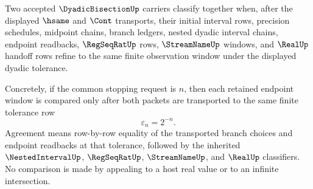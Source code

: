 \begin{definition}
\label{def:dyadic-bisection-classifier}
Two accepted $\DyadicBisectionUp$ carriers classify together when, after the displayed $\hsame$ and $\Cont$ transports, their initial interval rows, precision schedules, midpoint chains, branch ledgers, nested dyadic interval chains, endpoint readbacks, $\RegSeqRatUp$ rows, $\StreamNameUp$ windows, and $\RealUp$ handoff rows refine to the same finite observation window under the displayed dyadic tolerance.

Concretely, if the common stopping request is $n$, then each retained endpoint window is compared only after both packets are transported to the same finite tolerance row
$$
\varepsilon_n = 2^{-n}.
$$
Agreement means row-by-row equality of the transported branch choices and endpoint readbacks at that tolerance, followed by the inherited $\NestedIntervalUp$, $\RegSeqRatUp$, $\StreamNameUp$, and $\RealUp$ classifiers. No comparison is made by appealing to a host real value or to an infinite intersection.
\end{definition}

